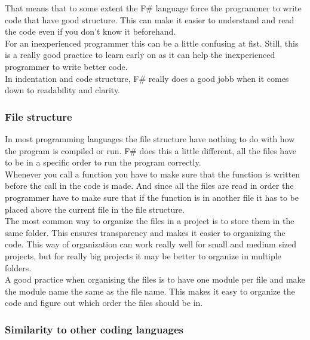 \documentclass[12pt, a4paper]{article}
\begin{document}
That means that to some extent the F\# language force the programmer to write code that have good structure. This can make it easier to understand and read the code even if you don't know it beforehand.\\

For an inexperienced programmer this can be a little confusing at fist. Still, this is a really good practice to learn early on as it can help the inexperienced programmer to write better code.\\

In indentation and code structure, F\# really does a good jobb when it comes down to readability and clarity.

\newpage
\subsubsection{File structure}

In most programming languages the file structure have nothing to do with how the program is compiled or run. F\# does this a little different, all the files have to be in a specific order to run the program correctly.\\

Whenever you call a function you have to make sure that the function is written before the call in the code is made. And since all the files are read in order the programmer have to make sure that if the function is in another file it has to be placed above the current file in the file structure.\\

The most common way to organize the files in a project is to store them in the same folder. This ensures transparency and makes it easier to organizing the code. This way of organization can work really well for small and medium sized projects, but for really big projects it may be better to organize in multiple folders.\\

A good practice when organising the files is to have one module per file and make the module name the same as the file name. This makes it easy to organize the code and figure out which order the files should be in.\\

\newpage
\subsubsection{Similarity to other coding languages}
\end{document}
